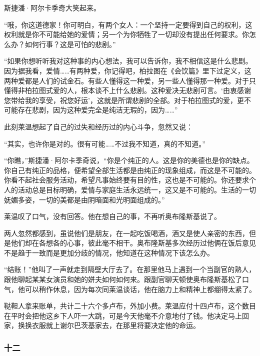 \par 斯捷潘·阿尔卡季奇大笑起来。
\par “哦，你这道德家！你可明白，有两个女人：一个坚持一定要得到自己的权利，这权利就是你不可能给她的爱情；另一个为你牺牲了一切却没有提出任何要求。你怎么办？如何行事？这是可怕的悲剧。”
\par “如果你想听听我对这种事的内心想法，我可以告诉你，我不相信这是什么悲剧。因为据我看，爱情……有两种爱，你记得吧，柏拉图在《会饮篇》里下过定义，这两种爱都是人们的试金石。有些人懂得这一种爱，另一些人懂得那一种爱。对于只懂得非柏拉图式爱的人，根本谈不上什么悲剧。这种爱决无悲剧可言。‘由衷感谢您带给我的享受，祝您好运’，这就是所谓悲剧的全部。对于柏拉图式的爱，更不可能存在悲剧，因为这种爱完全是纯洁无瑕的，因为……”
\par 此刻莱温想起了自己的过失和经历过的内心斗争，忽然又说：
\par “其实，也许你是对的。很有可能……不过我不知道，真的不知道。”
\par “你瞧，”斯捷潘·阿尔卡季奇说，“你是个纯正的人。这是你的美德也是你的缺点。你自己有纯正的品格，便希望全部生活都是由纯正的现象组成，而这是不可能的。你看不起社会服务活动，希望凡事始终要有目的性，这也是不可能的。你还要求个人的活动总是目标明确，爱情与家庭生活永远统一，这又是不可能的。生活的一切妩媚多姿，一切的美都是由阴暗面和光明面组成的。”
\par 莱温叹了口气，没有回答。他在想自己的事，不再听奥布隆斯基说了。
\par 两人忽然都感到，虽说他们是朋友，在一起吃饭喝酒，酒又是使人亲密的东西，但是他们却在各想各的心事，彼此毫不相干。奥布隆斯基多次经历过他俩在饭后意见不是趋于一致而是更加分歧的情况，他知道在这种情况下该怎么办。
\par “结账！”他叫了一声就走到隔壁大厅去了。在那里他马上遇到一个当副官的熟人，跟他聊起某某女演员和她的姘夫如何如何来。跟副官聊天顿使奥布隆斯基松了口气，他可以稍作休息，因为每次同莱温谈话，他在脑力上和精神上都绷得太紧了。
\par 鞑靼人拿来账单，共计二十六个多卢布，外加小费。莱温应付十四卢布，这个数目在平时会把他这乡下人吓一大跳，可是今天他毫不介意地付了钱。他决定马上回家，换换衣服就上谢尔巴茨基家去，在那里将要决定他的命运。


\subsubsection*{十二}

